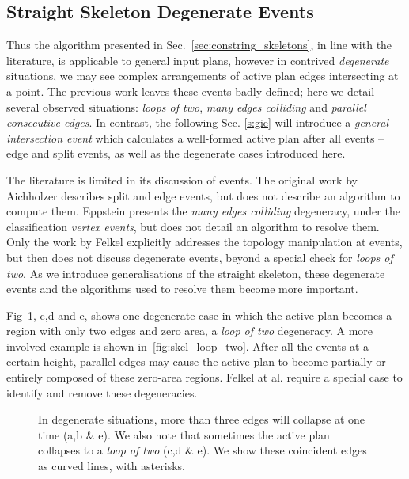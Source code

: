 \subsection{Straight Skeleton Degenerate Events}
\label{s:ssd}

Thus the algorithm presented in Sec.~\ref{sec:constring_skeletons}, in line with the literature, is applicable to general input plans, however in contrived \emph{degenerate} situations, we may see complex arrangements of active plan edges intersecting at a point. The previous work leaves these events badly defined; here we detail several observed situations: \emph{loops of two}, \emph{many edges colliding} and \emph{parallel consecutive edges}. In contrast, the following Sec. \ref{s:gie} will introduce a \emph{general intersection event} which calculates a well-formed active plan after all events -- edge and split events, as well as the degenerate cases introduced here.

The literature is limited in its discussion of events. The original work by Aichholzer\cite{Aichholzer95} describes split and edge events, but does not describe an algorithm to compute them. Eppstein\cite{Epp:98} presents the \emph{many edges colliding} degeneracy, under the classification \emph{vertex events}, but does not detail an algorithm to resolve them. Only the work by Felkel\cite{Felkel98} explicitly addresses the topology manipulation at events, but then does not discuss degenerate events, beyond a special check for \emph{loops of two}. As we introduce generalisations of the straight skeleton, these degenerate events and the algorithms used to resolve them become more important.

Fig~\ref{fig:skel_unweighted_intro_2}, c,d and e, shows one degenerate case in which the active plan becomes a region with only two edges and zero area, a \emph{loop of two} degeneracy. A more involved example is shown in~\ref{fig:skel_loop_two}. After all the events at a certain height, parallel edges may cause the active plan to become partially or entirely composed of these zero-area regions. Felkel at al.\cite{Felkel:1998:SKI} require a special case to identify and remove these degeneracies. 

\begin{figure}
  \centering
  \def\svgwidth{1.0\columnwidth}
  
  \caption[Various degenerate situations]{\label{fig:skel_unweighted_intro_2} In degenerate situations, more than three edges will collapse at one time (a,b \& e). We also note that sometimes the active plan collapses to a \emph{loop of two} (c,d \& e). We show these coincident edges as curved lines, with asterisks.}
\end{figure}

